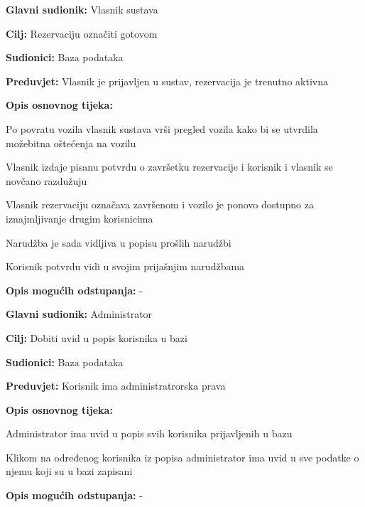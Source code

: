					\noindent {}
					\begin{packed_item}
	
						\item \textbf{Glavni sudionik: }Vlasnik sustava
						\item  \textbf{Cilj: }Rezervaciju označiti gotovom
						\item  \textbf{Sudionici: }Baza podataka
						\item  \textbf{Preduvjet: }Vlasnik je prijavljen u sustav, rezervacija je trenutno aktivna
						\item  \textbf{Opis osnovnog tijeka:}
						
						\item[] \begin{packed_enum}
							\item Po povratu vozila vlasnik sustava vrši pregled vozila kako bi se utvrdila možebitna oštećenja na vozilu
							\item Vlasnik izdaje pisanu potvrdu o završetku rezervacije i korisnik i vlasnik se novčano razdužuju
							\item Vlasnik rezervaciju označava završenom i vozilo je ponovo dostupno za iznajmljivanje drugim korisnicima
							\item Narudžba je sada vidljiva u popisu prošlih narudžbi
							\item Korisnik potvrdu vidi u svojim prijašnjim narudžbama
						\end{packed_enum}
						
						\item  \textbf{Opis mogućih odstupanja:} -
					\end{packed_item}
					
					
					\noindent \underbar{\textbf{UC 20 - Pregled korisnika}}
					\begin{packed_item}
	
						\item \textbf{Glavni sudionik: }Administrator
						\item  \textbf{Cilj: }Dobiti uvid u popis korisnika u bazi
						\item  \textbf{Sudionici: }Baza podataka
						\item  \textbf{Preduvjet: }Korisnik ima administratrorska prava
						\item  \textbf{Opis osnovnog tijeka:}
						
						\item[] \begin{packed_enum}
							\item Administrator ima uvid u popis svih korisnika prijavljenih u bazu
							\item Klikom na određenog korisnika iz popisa administrator ima uvid u sve podatke o njemu koji su u bazi zapisani
						\end{packed_enum}
						
						\item  \textbf{Opis mogućih odstupanja: }-
					\end{packed_item}
					
